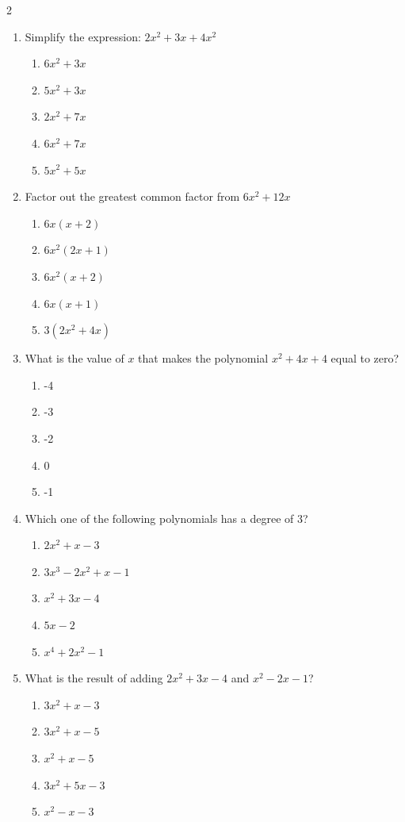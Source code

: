 \documentclass[10pt]{article}
\begin{document}
\begin{multicols}{2}
\begin{enumerate}[label=\textbf{Q\arabic*.}, leftmargin=*, itemsep=6pt, parsep=0pt]
  \item \small Simplify the expression: $2x^2 + 3x + 4x^2$
  \begin{enumerate}[label=(\Alph*), leftmargin=0.6cm, nosep, itemsep=2pt]
    \item $6x^2 + 3x$
    \item $5x^2 + 3x$
    \item $2x^2 + 7x$
    \item $6x^2 + 7x$
    \item $5x^2 + 5x$
  \end{enumerate}

  \item \small Factor out the greatest common factor from $6x^2 + 12x$
  \begin{enumerate}[label=(\Alph*), leftmargin=0.6cm, nosep, itemsep=2pt]
    \item $6x(x+2)$
    \item $6x^2(2x+1)$
    \item $6x^2(x+2)$
    \item $6x(x+1)$
    \item $3(2x^2 + 4x)$
  \end{enumerate}

  \item \small What is the value of $x$ that makes the polynomial $x^2 + 4x + 4$ equal to zero?
  \begin{enumerate}[label=(\Alph*), leftmargin=0.6cm, nosep, itemsep=2pt]
    \item -4
    \item -3
    \item -2
    \item 0
    \item -1
  \end{enumerate}

  \item \small Which one of the following polynomials has a degree of 3?
  \begin{enumerate}[label=(\Alph*), leftmargin=0.6cm, nosep, itemsep=2pt]
    \item $2x^2 + x - 3$
    \item $3x^3 - 2x^2 + x - 1$
    \item $x^2 + 3x - 4$
    \item $5x - 2$
    \item $x^4 + 2x^2 - 1$
  \end{enumerate}

  \item \small What is the result of adding $2x^2 + 3x - 4$ and $x^2 - 2x - 1$?
  \begin{enumerate}[label=(\Alph*), leftmargin=0.6cm, nosep, itemsep=2pt]
    \item $3x^2 + x - 3$
    \item $3x^2 + x - 5$
    \item $x^2 + x - 5$
    \item $3x^2 + 5x - 3$
    \item $x^2 - x - 3$
  \end{enumerate}


\end{enumerate}
\end{multicols}
\end{document}
